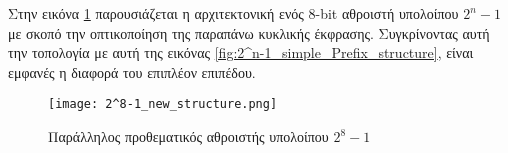 Στην εικόνα \ref{fig:2^8-1_new_structure} παρουσιάζεται η αρχιτεκτονική ενός 8-bit αθροιστή υπολοίπου $2^n-1$ με σκοπό την οπτικοποίηση της παραπάνω κυκλικής έκφρασης. Συγκρίνοντας αυτή την τοπολογία με αυτή της εικόνας \ref{fig:2^n-1_simple_Prefix_structure}, είναι εμφανές η διαφορά του επιπλέον επιπέδου.
\begin{figure}[H]
\centering
\texttt{[image: 2^8-1\_new\_structure.png]}
\caption{Παράλληλος προθεματικός αθροιστής υπολοίπου $2^8-1$}
\label{fig:2^8-1_new_structure}
\end{figure}





